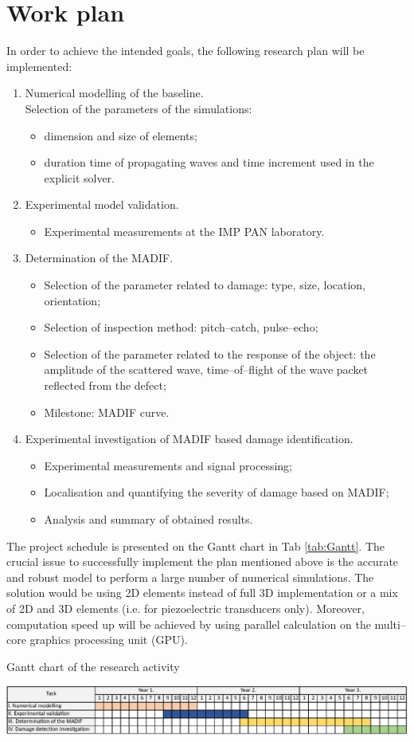 \documentclass[a4paper,12pt]{article}
\begin{document}
\section{Work plan}
In order to achieve the intended goals, the following research plan will be implemented:
\begin{enumerate}[label=\Roman*.]
	\item Numerical modelling of the baseline.\\
	Selection of the parameters of the simulations:
	\begin{itemize}
		\item dimension and size of elements; 
		\item duration time of propagating waves and time increment used in the explicit solver.
	\end{itemize}
	\item Experimental model validation.
	\begin{itemize}
		\item Experimental measurements at the IMP PAN laboratory.
	\end{itemize}
	\item Determination of the MADIF.
	\begin{itemize}
		\item Selection of the parameter related to damage: type, size, location, orientation;
		\item Selection of inspection method: pitch--catch, pulse--echo;
		\item Selection of the parameter related to the response of the object: the amplitude of the scattered wave, time--of--flight of the wave packet reflected from the defect;
		\item Milestone: MADIF curve.
		\end{itemize}
	\item Experimental investigation of MADIF based damage identification.
	\begin{itemize}
		\item Experimental measurements and signal processing;
		\item Localisation and quantifying the severity of damage based on MADIF;
		\item Analysis and summary of obtained results.
	\end{itemize}
\end{enumerate}
The project schedule is presented on the Gantt chart in Tab \ref{tab:Gantt}.
The crucial issue to successfully implement the plan mentioned above is the accurate and robust model to perform a large number of numerical simulations. The solution would be using 2D elements instead of full 3D implementation or a mix of 2D and 3D elements (i.e. for piezoelectric transducers only). Moreover, computation speed up will be achieved by using parallel calculation on the multi--core graphics processing unit (GPU).
\begin{table}[h]
	\caption{Gantt chart of the research activity}
	\label{tab:Gantt}
	\includegraphics[width=1\textwidth]{../Figures/Gantt.eps}
\end{table}
\end{document}
